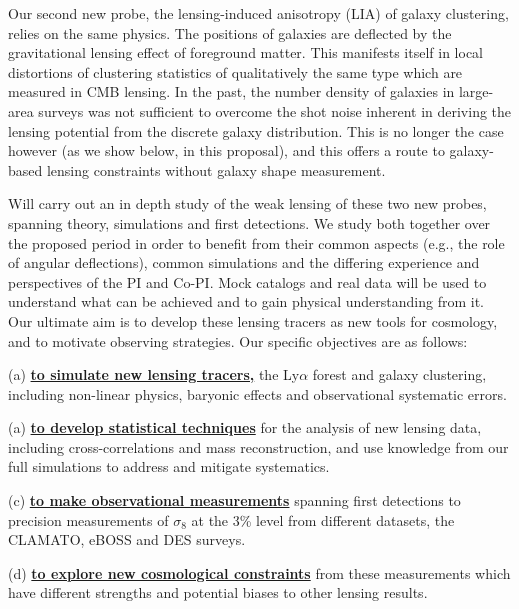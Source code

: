Our second new probe, the lensing-induced  anisotropy (LIA) 
of galaxy clustering,
relies on the same physics. The positions
of galaxies are deflected by the gravitational lensing effect of
foreground matter. This manifests itself in local distortions of
clustering statistics of qualitatively 
the same type which are measured in CMB lensing.
In the past, the number density of galaxies in large-area surveys 
was not sufficient to overcome the shot noise inherent in deriving
the lensing potential from the discrete galaxy distribution. This is
no longer the case however (as we show below, in this proposal), and
this offers a route to galaxy-based lensing constraints without
galaxy shape measurement.

Will carry out an in depth study of 
the weak lensing of these two new probes, spanning theory, 
simulations and first detections. 
We study both together over the proposed period in order to benefit from
their common aspects (e.g., the role of angular deflections), common
simulations and
the differing experience and perspectives of the PI and Co-PI.
Mock catalogs and  real 
data will be used
 to understand what can be achieved and to gain physical understanding
from it. Our ultimate aim is to develop these lensing tracers as new tools
for cosmology, and to motivate 
observing strategies.
Our specific objectives are as follows:

(a) {\bf \underline{to simulate new lensing tracers,}} the Ly$\alpha$ forest and galaxy clustering,
 including non-linear physics, baryonic effects and observational
systematic errors.

(a) {\bf \underline{to develop statistical techniques}} for the analysis of new lensing data, including 
cross-correlations and mass reconstruction, and use knowledge from our full simulations to address and mitigate systematics.


(c) {\bf \underline{to make observational measurements}} spanning first 
detections to precision measurements of $\sigma_{8}$ at the 3\% level 
from different datasets, the CLAMATO, eBOSS and DES surveys.

(d) {\bf \underline{to explore new cosmological constraints}} from these
measurements which have different strengths and potential biases  to other
lensing results.

